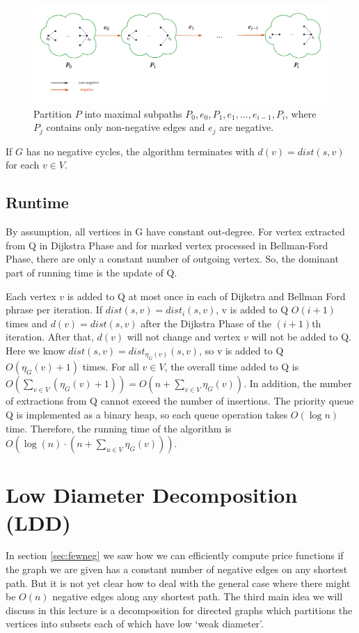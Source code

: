 \documentclass[11pt]{article}
\begin{document}
\begin{figure}[ht]
    \centering
    \includegraphics[width=0.9\linewidth]{images/partition.pdf}
    \caption{Partition $P$ into maximal subpaths $P_0, e_0, P_1, e_1, ..., e_{i-1}, P_i$, where $P_j$ contains only non-negative edges and $e_j$ are negative.}
\end{figure}

\begin{corollary}
    If $G$ has no negative cycles, the algorithm terminates with $d(v) = dist(s, v)$ for each $v \in V$.
\end{corollary}

\subsection{Runtime}
By assumption, all vertices in G have constant out-degree. For vertex extracted from Q in Dijkstra Phase and for marked vertex processed in Bellman-Ford Phase, there are only a constant number of outgoing vertex. So, the dominant part of running time is the update of Q.

Each vertex $v$ is added to Q at most once in each of Dijkstra and Bellman Ford phrase per iteration. If $dist(s, v) = dist_i(s, v)$, v is added to Q $O(i+1)$ times and $d(v) = dist(s, v)$ after the Dijkstra Phase of the $(i+1)$th iteration. After that, $d(v)$ will not change and vertex $v$ will not be added to Q. Here we know $dist(s, v) = dist_{\eta_{G}(v)}(s, v)$, so v is added to Q $O(\eta_G(v) + 1)$ times. For all $v \in V$, the overall time added to Q is $O(\sum_{v \in V}(\eta_G(v)+1)) = O(n + \sum_{v \in V}\eta_G(v))$. In addition, the number of extractions from Q cannot exceed the number of insertions. The priority queue Q is implemented as a binary heap, so each queue operation takes $O(\log n)$ time. Therefore, the running time of the algorithm is $O(\log(n) \cdot (n + \sum_{u \in V}\eta_G(v)))$.

\section{Low Diameter Decomposition (LDD)}
In section \ref{sec:fewneg} we saw how we can efficiently compute price functions if the graph we are given has a constant number of negative edges on any shortest path. But it is not yet clear how to deal with the general case where there might be $O(n)$ negative edges along any shortest path. The third main idea we will discuss in this lecture is a decomposition for directed graphs which partitions the vertices into subsets each of which have low `weak diameter'. 
\end{document}
